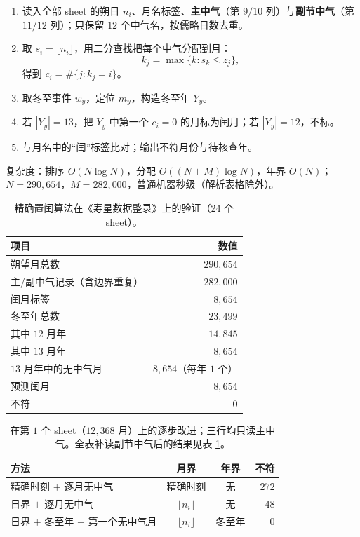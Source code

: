 \begin{enumerate}[label=\textbf{步骤 \arabic*.}, leftmargin=*]
    \item 读入全部 sheet 的朔日 \(n_i\)、月名标签、\textbf{主中气}（第 \(9/10\) 列）与\textbf{副节中气}（第 \(11/12\) 列）；只保留 \(12\) 个中气名，按儒略日数去重。
    \item 取 \(s_i=\lfloor n_i\rfloor\)，用二分查找把每个中气分配到月：
    \[
    k_j=\max\{k: s_k\le z_j\},
    \]
    得到 \(c_i=\#\{j:k_j=i\}\)。
    \item 取冬至事件 \(w_y\)，定位 \(m_y\)，构造冬至年 \(Y_y\)。
    \item 若 \(|Y_y|=13\)，把 \(Y_y\) 中第一个 \(c_i=0\) 的月标为闰月；若 \(|Y_y|=12\)，不标。
    \item 与月名中的“闰”标签比对；输出不符月份与待核查年。
\end{enumerate}

复杂度：排序 \(O(N\log N)\)，分配 \(O((N+M)\log N)\)，年界 \(O(N)\)；\(N=290{,}654\)，\(M=282{,}000\)，普通机器秒级（解析表格除外）。

\begin{table}[htbp]
\centering
\caption{精确置闰算法在《寿星数据整录》上的验证（24 个 sheet）。}
\label{tab:exact_intercalation_validation}
\begin{tabular}{lr}
\toprule
项目 & 数值 \\
\midrule
朔望月总数 & \(290{,}654\) \\
主/副中气记录（含边界重复） & \(282{,}000\) \\
闰月标签 & \(8{,}654\) \\
冬至年总数 & \(23{,}499\) \\
其中 \(12\) 月年 & \(14{,}845\) \\
其中 \(13\) 月年 & \(8{,}654\) \\
\(13\) 月年中的无中气月 & \(8{,}654\)（每年 \(1\) 个） \\
预测闰月 & \(8{,}654\) \\
不符 & \(0\) \\
\bottomrule
\end{tabular}
\end{table}

\begin{table}[htbp]
\centering
\caption{在第 \(1\) 个 sheet（\(12{,}368\) 月）上的逐步改进；三行均只读主中气。全表补读副节中气后的结果见表 \ref{tab:exact_intercalation_validation}。}
\label{tab:exact_intercalation_comparison}
\begin{tabular}{lccr}
\toprule
方法 & 月界 & 年界 & 不符 \\
\midrule
精确时刻 \(+\) 逐月无中气 & 精确时刻 & 无 & \(272\) \\
日界 \(+\) 逐月无中气 & \(\lfloor n_i\rfloor\) & 无 & \(48\) \\
日界 \(+\) 冬至年 \(+\) 第一个无中气月 & \(\lfloor n_i\rfloor\) & 冬至年 & \(0\) \\
\bottomrule
\end{tabular}
\end{table}

